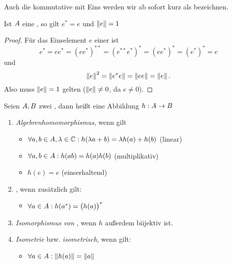\begin{bem}
Auch die kommutative \CAlgn{} mit Eins werden wir ab sofort kurz als \emph{\CAlgn} bezeichnen.
\end{bem}

\begin{kor}\label{lemma:CAlg-Eigenschaften}
Ist $A$ eine \CAlg{}, so gilt $e^* = e$ und $\left\lVert e\right\rVert = 1$
\end{kor}

\begin{proof}%
Für das Einselement $e$ einer \CAlg{} ist
	\[e^* = ee^* = (ee^*)^{**} = (e^{**}e^*)^* = (ee^*)^* = (e^*)^* = e\]
und
	\[\left\lVert e\right\rVert^2 = \left\lVert e^*e\right\rVert = \left\lVert ee\right\rVert = \left\lVert e\right\rVert.\]
Also muss $\left\lVert e\right\rVert = 1$ gelten ($\left\lVert e\right\rVert \neq 0$, da $e \neq 0$).
\end{proof}


\begin{defn}\label{defn:AlgHom}\label{defn:CAlgHom}\label{defn:CAlgIso}\label{defn:Isometrie}
Seien $A, B$ zwei \CAlgn, dann heißt eine Abbildung $h: A \to B$ 
\begin{enumerate}
\item\emph{Algebrenhomomorphismus}, wenn gilt
\begin{itemize}
	\item $\forall a,b \in A, \lambda \in \mathbb{C}: h(\lambda a + b) = \lambda h(a) + h(b)$ (linear)
	\item $\forall a,b \in A: h(ab) = h(a)h(b)$ (multiplikativ)
	\item $h(e) = e$ (einserhaltend)
\end{itemize}

\item\emph{{\CAlgHom}}, wenn zusätzlich gilt:
\begin{itemize}
	\item $\forall a \in A: h(a^*) = \big(h(a)\big)^*$
\end{itemize}

\item\emph{Isomorphismus von \CAlgn}, wenn $h$ außerdem biijektiv ist.

\item\emph{Isometrie} bzw. \emph{isometrisch}, wenn gilt:
\begin{itemize}
	\item $\forall a \in A: \left\lVert h(a)\right\rVert = \left\lVert a\right\rVert$
\end{itemize}

\end{enumerate}
\end{defn}

